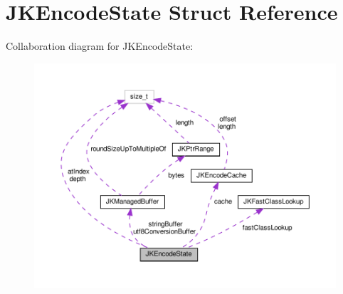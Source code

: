 \hypertarget{structJKEncodeState}{}\section{J\+K\+Encode\+State Struct Reference}
\label{structJKEncodeState}


Collaboration diagram for J\+K\+Encode\+State\+:
\nopagebreak
\begin{figure}[H]
\begin{center}
\leavevmode
\includegraphics[width=350pt]{structJKEncodeState__coll__graph}
\end{center}
\end{figure}
